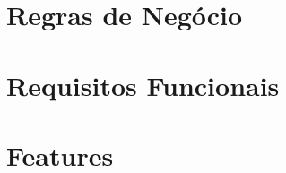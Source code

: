 \documentclass[dvips,ruledheader]{abnt}
\author{Álvaro Vilobaldo \emph{Rios}\\
Marcio \emph{Fernandes} Justino}
\begin{document}

%



\tableofcontents

\part{Regras de Negócio}












\part{Requisitos Funcionais}




\part{Features}


% 
% 
\end{document}
